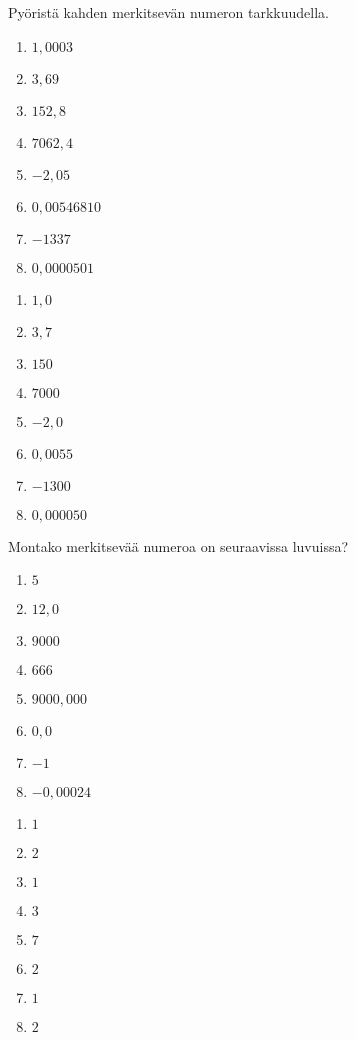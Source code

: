 \begin{tehtava}
Pyöristä kahden merkitsevän numeron tarkkuudella.
\begin{enumerate}
\item $1,0003$
\item $3,69$
\item $152,8$
\item $7062,4$
\item $-2,05$
\item $0,00546810$
\item $-1337$
\item $0,0000501$
\end{enumerate}
\begin{vastaus}
\begin{enumerate}
\item $1,0$
\item $3,7$
\item $150$
\item $7000$
\item $-2,0$
\item $0,0055$
\item $-1300$
\item $0,000050$
\end{enumerate}
\end{vastaus}
\end{tehtava}

\begin{tehtava}
Montako merkitsevää numeroa on seuraavissa luvuissa?
\begin{enumerate}
\item $5$
\item $12,0$
\item $9000$
\item $666$
\item $9000,000$
\item $0,0$
\item $-1$
\item $-0,00024$
\end{enumerate}
\begin{vastaus}
\begin{enumerate}
\item $1$
\item $2$
\item $1$
\item $3$
\item $7$
\item $2$
\item $1$
\item $2$
\end{enumerate}
\end{vastaus}
\end{tehtava}
 